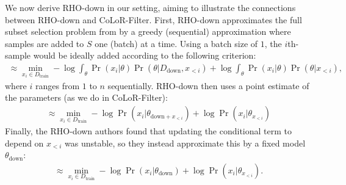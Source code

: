 \documentclass{article}
\newcommand{\Ddown}{D_{\text{down}}}
\newcommand{\Dtrain}{D_{\text{train}}}
\newcommand{\thetadown}{\theta_{\text{down}}}
\newcommand{\thetadownx}{\theta_{\text{down}+x_{<i}}}
\newcommand{\thetax}{\theta_{x_{<i}}}
\begin{document}
We now derive RHO-down in our setting, aiming to illustrate the connections between RHO-down and CoLoR-Filter.
First, RHO-down approximates the full subset selection problem from  by a greedy (sequential) approximation where samples are added to $ S $ one (batch) at a time. Using a batch size of $1$, the $i$th-sample would be ideally added according to the following criterion:
\begin{align}
     \approx \min_{x_i \in \Dtrain}   -\log \int_\theta\Pr(x_i| \theta)\Pr(\theta | \Ddown, x_{<i}) + \log \int_\theta \Pr(x_i | \theta)\Pr(\theta| x_{<i}),
\end{align}
where $i$ ranges from $1$ to $n$ sequentially.
RHO-down then uses a point estimate of the parameters (as we do in CoLoR-Filter):
\begin{align}
     \approx \min_{x_i \in \Dtrain}  -\log \Pr(x_i| \thetadownx) + \log  \Pr(x_i | \thetax)
\end{align}
Finally, the RHO-down authors found that updating the conditional term to depend on $ x_{<i}$ was unstable, so they instead approximate this by a fixed model $ \thetadown$:
\begin{align}
     \approx \min_{x_i \in \Dtrain} -\log \Pr(x_i| \thetadown) + \log  \Pr(x_i | \thetax).
\end{align}

\end{document}

